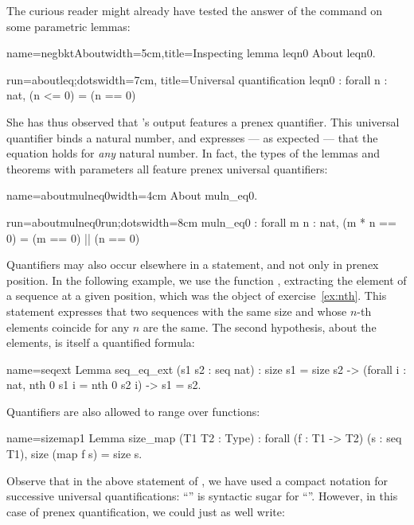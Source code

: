 The curious reader might already have tested the answer of the
 command on some parametric lemmas:

\begin{coq-left}{name=negbktAbout}{width=5cm,title=Inspecting lemma leqn0}
About leqn0.
\end{coq-left}
\begin{coqout-right}{run=aboutleq;dots}{width=7cm, title=Universal quantification}
leqn0 : forall n : nat, (n <= 0) = (n == 0)
\end{coqout-right}

She has thus observed that \Coq{}'s output features a prenex
 quantifier. This universal quantifier binds a natural number, and
expresses --- as expected --- that the equation holds for \emph{any}
natural number. In fact, the types of the lemmas and theorems with
parameters all feature prenex universal quantifiers:

\begin{coq-left}{name=aboutmulneq0}{width=4cm}
About muln_eq0.
$~$
\end{coq-left}
\begin{coqout-right}{run=aboutmulneq0run;dots}{width=8cm}
muln_eq0 : forall m n : nat,
  (m * n == 0) = (m == 0) || (n == 0)
\end{coqout-right}

Quantifiers may also occur elsewhere in a statement, and not only in
prenex position.  In the following example, we use the function
, extracting the element of a sequence at a given position, which was
the object of exercise~\ref{ex:nth}. This statement expresses that two
sequences with the same size and whose $n$-th elements coincide for any
$n$ are the same. The second hypothesis, about the elements, is
itself a quantified formula:

\begin{coq}{name=seqext}{}
Lemma seq_eq_ext (s1 s2 : seq nat) :
  size s1 = size s2 ->
  (forall i : nat, nth 0 s1 i = nth 0 s2 i) ->
  s1 = s2.
\end{coq}
Quantifiers are also allowed to range over functions:

\begin{coq}{name=sizemap1}{}
Lemma size_map (T1 T2 : Type) :
  forall (f : T1 -> T2) (s : seq T1), size (map f s) = size s.
\end{coq}
Observe that in the above statement of , we have used a
compact notation for successive universal quantifications:
``'' is syntactic sugar for
``''. However, in this case
of prenex quantification, we could just as well write:


